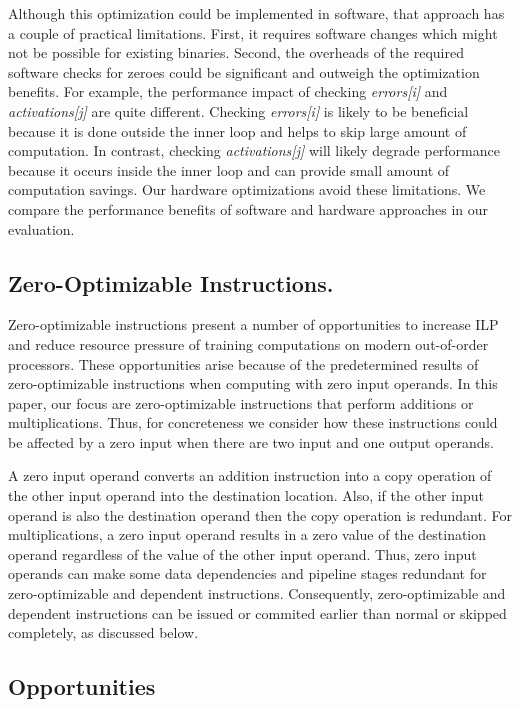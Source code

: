 Although this optimization could be implemented in software, that approach has a couple of practical limitations.   First, it requires software changes which might not be possible for existing binaries.   Second, the overheads of the required software checks for zeroes could be significant and outweigh the optimization benefits.  For example,  the performance impact of checking \emph{errors[i]} and \emph{activations[j]} are quite different.  Checking \emph{errors[i]} is likely to be beneficial because it is done outside the inner loop and helps to skip large amount of computation. In contrast, checking \emph{activations[j]} will likely degrade performance because it occurs inside the inner loop and can provide small amount of computation savings. Our hardware optimizations  avoid these limitations.  We compare the performance benefits of software and hardware  approaches in our evaluation. 

\subsection{Zero-Optimizable Instructions.}

Zero-optimizable instructions present a number of opportunities to increase ILP and reduce resource pressure of training computations on modern out-of-order processors.  These opportunities arise because of the predetermined results of zero-optimizable instructions when computing with zero input operands.  In this paper, our focus are zero-optimizable instructions that perform additions or multiplications.  Thus, for concreteness we consider how these instructions could be affected by a zero input when there are two input and one output operands.  

 A zero input operand converts an addition instruction into a copy operation of the other input operand into the destination location. Also, if the other input operand is also the destination operand then the copy operation is redundant.  For multiplications, a zero input operand results in a zero value of the destination operand regardless of the value of the other input operand.  Thus, zero input operands can make some data dependencies and pipeline stages redundant for zero-optimizable and dependent instructions.  Consequently, zero-optimizable and dependent instructions can be issued or commited earlier than normal or skipped completely, as discussed below. 


\subsection{Opportunities}

